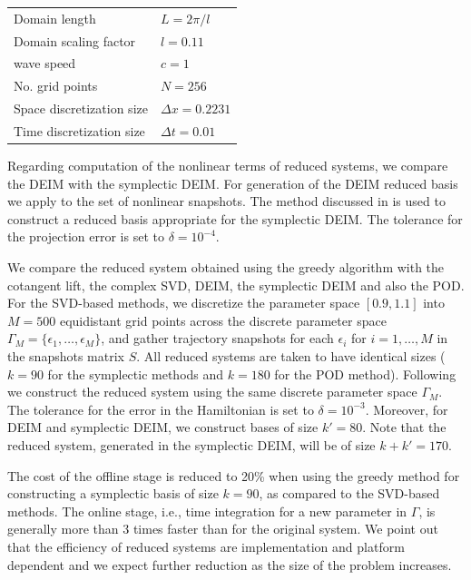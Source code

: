 \vspace{0.5cm}
\begin{center}
\begin{tabular}{|l|l|}
\hline
Domain length & $L = 2\pi /l$ \\
Domain scaling factor & $l = 0.11$ \\
wave speed & $c =1$\\
No. grid points & $N = 256$ \\
Space discretization size & $\Delta x = 0.2231$ \\
Time discretization size & $\Delta t = 0.01$ \\
\hline
\end{tabular}
\end{center}
\vspace{0.5cm}
Regarding computation of the nonlinear terms of reduced systems, we compare the DEIM with the symplectic DEIM. For generation of the DEIM reduced basis we apply  to the set of nonlinear snapshots. The method discussed in  is used to construct a reduced basis appropriate for the symplectic DEIM. The tolerance for the projection error is set to $\delta = 10^{-4}$.

We compare the reduced system obtained using the greedy algorithm with the cotangent lift, the complex SVD, DEIM, the symplectic DEIM and also the POD. For the SVD-based methods, we discretize the parameter space $[0.9,1.1]$ into $M=500$ equidistant grid points across the discrete parameter space $\Gamma_M = \{\epsilon_1,\dots,\epsilon_M \}$, and gather trajectory snapshots for each $\epsilon_i$ for $i = 1,\dots,M$ in the snapshots matrix $S$. All reduced systems are taken to have identical sizes ($k=90$ for the symplectic methods and $k=180$ for the POD method). Following  we construct the reduced system using the same discrete parameter space $\Gamma_M$. The tolerance for the error in the Hamiltonian is set to $\delta = 10^{-3}$. Moreover, for DEIM and symplectic DEIM, we construct bases of size $k'=80$. Note that the reduced system, generated in the symplectic DEIM, will be of size $k+k'=170$.

The cost of the offline stage is reduced to 20\% when using the greedy method for constructing a symplectic basis of size $k=90$, as compared to the SVD-based methods. The online stage, i.e., time integration for a new parameter in $\Gamma$, is generally more than 3 times faster than for the original system. We point out that the efficiency of reduced systems are implementation and platform dependent and we expect further reduction as the size of the problem increases.
  
